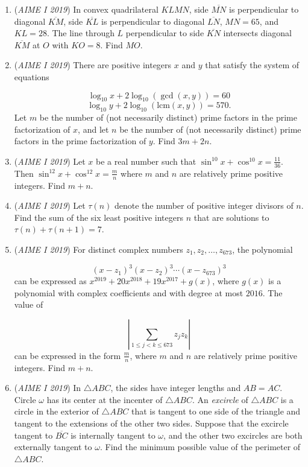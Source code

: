 \begin{enumerate}
 

	\item (\textit{AIME I 2019}) In convex quadrilateral $KLMN$, side $\overline{MN}$ is perpendicular to diagonal $\overline{KM}$, side $\overline{KL}$ is perpendicular to diagonal $\overline{LN}$, $MN = 65$, and $KL = 28$. The line through $L$ perpendicular to side $\overline{KN}$ intersects diagonal $\overline{KM}$ at $O$ with $KO = 8$. Find $MO$.


 

	\item (\textit{AIME I 2019}) There are positive integers $x$ and $y$ that satisfy the system of equations

 \[\log_{10} x + 2 \log_{10} (\gcd(x,y)) = 60\] 
 \[\log_{10} y + 2 \log_{10} (\text{lcm}(x,y)) = 570.\]
Let $m$ be the number of (not necessarily distinct) prime factors in the prime factorization of $x$, and let $n$ be the number of (not necessarily distinct) prime factors in the prime factorization of $y$. Find $3m+2n$.


 

	\item (\textit{AIME I 2019}) Let $x$ be a real number such that $\sin^{10}x+\cos^{10} x = \frac{11}{36}$. Then $\sin^{12}x+\cos^{12} x = \frac{m}{n}$ where $m$ and $n$ are relatively prime positive integers. Find $m+n$.


 

	\item (\textit{AIME I 2019}) Let $\tau(n)$ denote the number of positive integer divisors of $n$. Find the sum of the six least positive integers $n$ that are solutions to $\tau (n) + \tau (n+1) = 7$.


 

	\item (\textit{AIME I 2019}) For distinct complex numbers $z_1,z_2,\dots,z_{673}$, the polynomial 

 \[(x-z_1)^3(x-z_2)^3 \cdots (x-z_{673})^3\]
can be expressed as $x^{2019} + 20x^{2018} + 19x^{2017}+g(x)$, where $g(x)$ is a polynomial with complex coefficients and with degree at most $2016$. The value of 

 \[\left| \sum_{1 \le j <k \le 673} z_jz_k \right|\]
can be expressed in the form $\frac{m}{n}$, where $m$ and $n$ are relatively prime positive integers. Find $m+n$.


 

	\item (\textit{AIME I 2019}) In $\triangle ABC$, the sides have integer lengths and $AB=AC$. Circle $\omega$ has its center at the incenter of $\triangle ABC$. An \textit{excircle} of $\triangle ABC$ is a circle in the exterior of $\triangle ABC$ that is tangent to one side of the triangle and tangent to the extensions of the other two sides. Suppose that the excircle tangent to $\overline{BC}$ is internally tangent to $\omega$, and the other two excircles are both externally tangent to $\omega$. Find the minimum possible value of the perimeter of $\triangle ABC$.



\end{enumerate}

